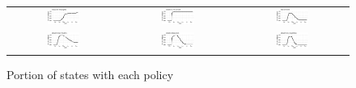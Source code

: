 \documentclass[11pt,reqno,letter]{amsart}
\theoremstyle{definition}
\begin{document}
\begin{figure}[ht]\caption{Portion of states with each
    policy \label{fig:policyportion}}
  \begin{minipage}{\linewidth}
    \begin{tabular}{ccc}
      \includegraphics[width=0.31\textwidth]{tables_and_figures/pmaskbus_p}
      &
        \includegraphics[width=0.31\textwidth]{tables_and_figures/pk12_p}
      &
        \includegraphics[width=0.31\textwidth]{tables_and_figures/pshelter_p}
      \\
      \includegraphics[width=0.31\textwidth]{tables_and_figures/pmovie_p}
      &
        \includegraphics[width=0.31\textwidth]{tables_and_figures/prestaurant_p}
      &
        \includegraphics[width=0.31\textwidth]{tables_and_figures/pnonessential_p}
    \end{tabular}
  \end{minipage}
\end{figure}
\end{document}
